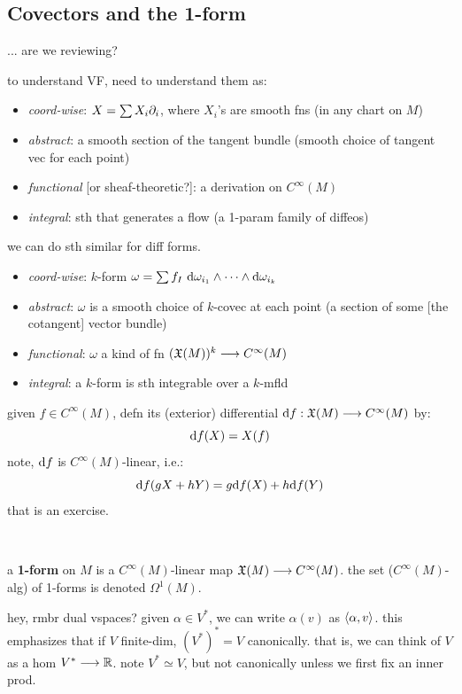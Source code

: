 \subsection{Covectors and the 1-form}
... are we reviewing?

to understand VF, need to understand them as:
\begin{itemize}
	\item \textit{coord-wise}: $X=\sum X_{i}\partial_{i}$, where $X_{i}$'s are smooth fns
		(in any chart on $M$)
	\item \textit{abstract}: a smooth section of the tangent bundle
		(smooth choice of tangent vec for each point)
	\item \textit{functional} [or sheaf-theoretic?]: a derivation on $C^{\infty}(M)$
	\item \textit{integral}: sth that generates a flow
		(a 1-param family of diffeos)
\end{itemize}

we can do sth similar for diff forms.
\begin{itemize}
	\item \textit{coord-wise}: $k$-form $\omega=\sum f_{I}\textrm{ d}\omega_{i_{1}}\wedge \cdots \wedge \textrm{d}\omega_{i_{k}}$
	\item \textit{abstract}: $\omega$ is a smooth choice of $k$-covec at each point
		(a section of some [the cotangent] vector bundle)
	\item \textit{functional}: $\omega$ a kind of fn $(\mathfrak{X}(M))^{k}\longrightarrow C^{\infty}(M)$
	\item \textit{integral}: a $k$-form is sth integrable over a $k$-mfld
\end{itemize}

\begin{xmp}
	given $f\in C^{\infty}(M)$, defn its (exterior) differential
	$\textrm{d} f:\mathfrak{X}(M)\longrightarrow C^{\infty}(M)$ by:
	\begin{equation*}
		\textrm{d} f(X) = X(f)
	\end{equation*}
	note, $\textrm{d} f$ is $C^{\infty}(M)$-linear, i.e.:
	\begin{equation*}
		\textrm{d} f(gX+hY)=g \textrm{d} f(X)+h\textrm{d} f(Y)
	\end{equation*}
	that is an exercise.
\end{xmp} \

\begin{defn}[title=Functional]
	a \textbf{1-form} on $M$ is a $C^{\infty}(M)$-linear map $\mathfrak{X}(M)\longrightarrow C^{\infty}(M)$.
	the set ($C^{\infty}(M)$-alg) of 1-forms is denoted $\Omega^{1}(M)$.
\end{defn}
hey, rmbr dual vspaces?
given $\alpha\in V^{*}$, we can write $\alpha(v)$ as $\left\langle{\alpha,v}\right\rangle$.
this emphasizes that if $V$ finite-dim, $(V^{*})^{*}=V$ canonically.
that is, we can think of $V$ as a hom $V^{*}\longrightarrow\mathbb{R}$.
note $V^{*}\simeq V$, but not canonically unless we first fix an inner prod.

